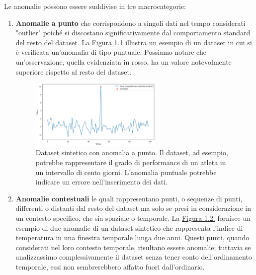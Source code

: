     Le anomalie possono essere suddivise in tre macrocategorie:
    \begin{enumerate}
        \item \textbf{Anomalie a punto} che corrispondono a singoli dati nel tempo considerati "outlier"
            poiché si discostano significativamente dal comportamento standard del resto del dataset. 
            La \hyperref[fig:point-anomaly]{Figura 1.1} 
            illustra un esempio di un dataset in cui si è verificata un'anomalia di tipo puntuale. Possiamo
            notare che un'osservazione, quella evidenziata in rosso, ha un valore notevolmente superiore 
            rispetto al resto del dataset.
            \begin{figure}[htb]
                \centering
                \includegraphics[width=0.6\textwidth]{./input/chapters/figs/point-anomaly.png}
                \caption{Dataset sintetico con anomalia a punto. Il dataset, ad esempio, potrebbe rappresentare il grado 
                di performance di un atleta in un intervallo di cento giorni. L'anomalia puntuale potrebbe indicare un 
                errore nell'inserimento dei dati.}
                \label{fig:point-anomaly}
            \end{figure}
        \item \textbf{Anomalie contestuali} le quali rappresentano punti, o sequenze di punti, differenti 
        o distanti dal resto del dataset ma solo se presi in considerazione in un contesto specifico, che sia
        spaziale o temporale. 
        La \hyperref[fig:contextual-anomaly]{Figura 1.2.} fornisce un esempio di due anomalie di un dataset 
        sintetico che rappresenta l'indice di temperatura in una finestra temporale lunga due anni. 
        Questi punti, quando considerati nel loro contesto temporale, risultano essere anomalie; 
        tuttavia se analizzassimo complessivamente il dataset senza tener conto dell'ordinamento temporale, 
        essi non sembrerebbero affatto fuori dall'ordinario.


\end{enumerate}

